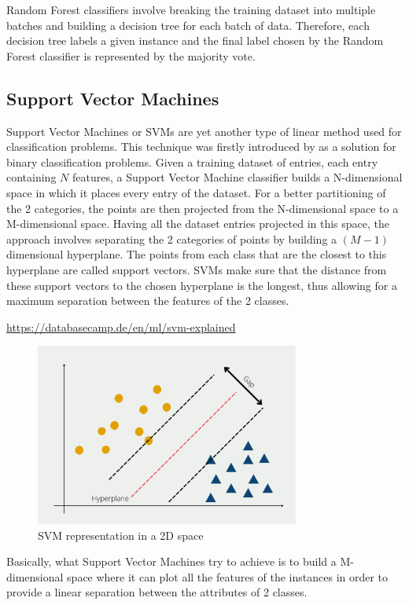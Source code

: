\documentclass[12pt,a4paper]{report}
\begin{document}
Random Forest classifiers involve breaking the training dataset into multiple batches and building a decision tree for each batch of data. Therefore, each decision tree labels a given instance and the final label chosen by the Random Forest classifier is represented by the majority vote.


\subsection{Support Vector Machines}
Support Vector Machines or SVMs are yet another type of linear method used for classification problems. This technique was firstly introduced by \citet{cortes1995support} as a solution for binary classification problems. Given a training dataset of entries, each entry containing $N$ features, a Support Vector Machine classifier builds a N-dimensional space in which it places every entry of the dataset. For a better partitioning of the 2 categories, the points are then projected from the N-dimensional space to a M-dimensional space. Having all the dataset entries projected in this space, the approach involves separating the 2 categories of points by building a $(M-1)$ dimensional hyperplane. The points from each class that are the closest to this hyperplane are called support vectors. SVMs make sure that the distance from these support vectors to the chosen hyperplane is the longest, thus allowing for a maximum separation between the features of the 2 classes.


\urldef{\urlSVM}\url{https://databasecamp.de/en/ml/svm-explained}
\begin{figure}[H]
\centering
\includegraphics[height=6cm]{pics/svm.png}
  \caption[SVM representation in a 2D space]{SVM representation in a 2D space \footnotemark}
  \label{fig:SVM}
\end{figure}

\footnotetext{\urlSVM}
Basically, what Support Vector Machines try to achieve is to build a M-dimensional space where it can plot all the features of the instances in order to provide a linear separation between the attributes of 2 classes.
\end{document}
